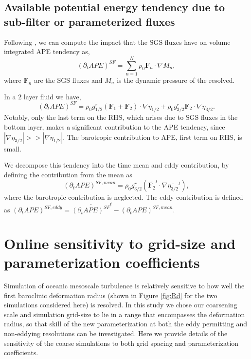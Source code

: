 \documentclass[draft]{agujournal2019}
\begin{document}
\subsection{Available potential energy tendency due to sub-filter or parameterized fluxes}
\label{app:online_metrics/APE_tend}
Following \cite{loose2023comparing}, we can compute the impact that the SGS fluxes have on volume integrated APE tendency as, 
\begin{equation}
    (\partial_t APE)^{SF} = \sum_{n=1}^{N} \rho_0 \mathbf{F}_n \cdot \nabla M_n,
\end{equation}
where $\mathbf{F}_n$ are the SGS fluxes and $M_n$ is the dynamic pressure of the resolved. 

In a 2 layer fluid we  have, 
\begin{equation}
    (\partial_t APE)^{SF} = \rho_0 g^r_{1/2} (\mathbf{F}_1 + \mathbf{F}_2) \cdot \nabla \eta_{1/2} +  \rho_0 g^r_{3/2} \mathbf{F}_2 \cdot \nabla \eta_{3/2}.
\end{equation}
Notably, only the last term on the RHS, which arises due to SGS fluxes in the bottom layer, makes a significant contribution to the APE tendency, since $|\nabla \eta_{3/2}| >> |\nabla \eta_{1/2}|$. The barotropic contribution to APE, first term on RHS, is small. 

We decompose this tendency into the time mean and eddy contribution, by defining the contribution from the mean as  
\begin{equation}
    (\partial_t APE)^{SF, mean} = \rho_0 g^r_{3/2} 
 (\overline{\mathbf{F}_2}^t \cdot \nabla \overline{ \eta_{3/2}}^t),
\end{equation}
where the barotropic contribution is neglected. The eddy contribution is defined as $(\partial_t APE)^{SF, eddy} =\overline{(\partial_t APE)^{SF}}^t-(\partial_t APE)^{SF, mean}$.





\section{Online sensitivity to grid-size and parameterization coefficients}
\label{app:online_sensitivity}

Simulation of oceanic mesoscale turbulence is relatively sensitive to how well the first baroclinic deformation radius (shown in Figure \ref{fig:Rd} for the two simulations considered here) is resolved. In this study we chose our coarsening scale and simulation grid-size to lie in a range that encompasses the deformation radius, so that skill of the new parameterization at both the eddy permitting and non-eddying resolutions can be investigated. Here we provide details of the sensitivity of the coarse simulations to both grid spacing and parameterization coefficients. 
\end{document}
